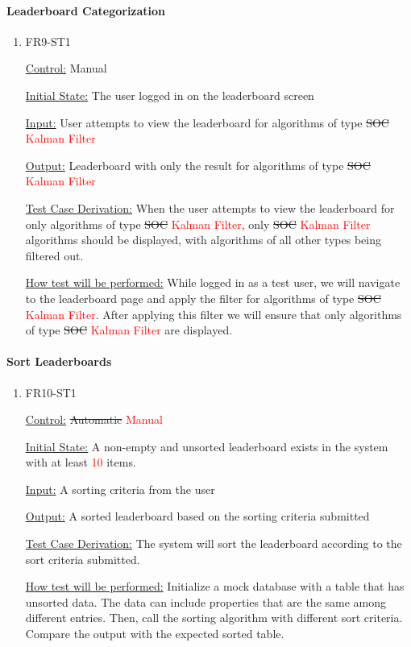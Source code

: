 \documentclass[12pt, titlepage]{article}
\begin{document}
\paragraph{Leaderboard Categorization}

\begin{enumerate}

\item{FR9-ST1\\}

\underline{Control:} Manual

\underline{Initial State:} The user logged in on the leaderboard screen

\underline{Input:} User attempts to view the leaderboard for algorithms of type \sout{SOC} \textcolor{red}{Kalman Filter}

\underline{Output:} Leaderboard with only the result for algorithms of type \sout{SOC} \textcolor{red}{Kalman Filter}

\underline{Test Case Derivation:} When the user attempts to view the leaderboard for only algorithms of type \sout{SOC} \textcolor{red}{Kalman Filter}, only \sout{SOC} \textcolor{red}{Kalman Filter} algorithms should be displayed, with algorithms of all other types being filtered out.

\underline{How test will be performed:} While logged in as a test user, we will navigate to the leaderboard page and apply the filter for algorithms of type \sout{SOC} \textcolor{red}{Kalman Filter}. After applying this filter we will ensure that only algorithms of type \sout{SOC} \textcolor{red}{Kalman Filter} are displayed.

\end{enumerate}

\paragraph{Sort Leaderboards}

\begin{enumerate}

\item{FR10-ST1\\}

\underline{Control:} \sout{Automatic} \textcolor{red} {Manual}

\underline{Initial State:} A non-empty and unsorted leaderboard exists in the system with at least \textcolor{red}{10} items.

\underline{Input:} A sorting criteria from the user

\underline{Output:} A sorted leaderboard based on the sorting criteria submitted

\underline{Test Case Derivation:} The system will sort the leaderboard according to the sort criteria submitted.

\underline{How test will be performed:} Initialize a mock database with a table that has unsorted data. The data can include properties that are the same among different entries. Then, call the sorting algorithm with different sort criteria. Compare the output with the expected sorted table.

\end{enumerate}
\end{document}
